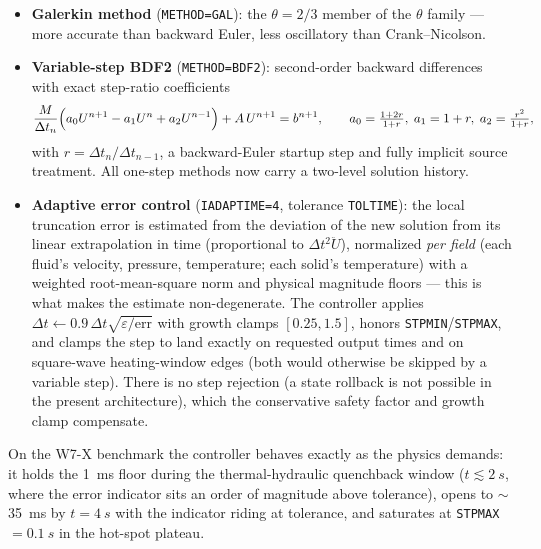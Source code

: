 \documentclass[11pt,a4paper]{article}
\newcommand{\code}[1]{\texttt{#1}}
\begin{document}
\begin{itemize}
  \item \textbf{Galerkin method} (\code{METHOD=GAL}): the $\theta=2/3$ member of the
        $\theta$ family --- more accurate than backward Euler, less oscillatory than
        Crank--Nicolson.
  \item \textbf{Variable-step BDF2} (\code{METHOD=BDF2}): second-order backward
        differences with exact step-ratio coefficients
        \begin{equation*}
          \frac{M}{\Delta t_n}\Bigl(a_0 U^{n+1} - a_1 U^{n} + a_2 U^{n-1}\Bigr)
            + A\,U^{n+1} = b^{n+1},\qquad
          a_0 = \tfrac{1+2r}{1+r},\;
          a_1 = 1+r,\;
          a_2 = \tfrac{r^2}{1+r},
        \end{equation*}
        with $r = \Delta t_n / \Delta t_{n-1}$, a backward-Euler startup step and
        fully implicit source treatment. All one-step methods now carry a two-level
        solution history.
  \item \textbf{Adaptive error control} (\code{IADAPTIME=4}, tolerance
        \code{TOLTIME}): the local truncation error is estimated from the deviation of
        the new solution from its linear extrapolation in time (proportional to
        $\Delta t^2 \ddot U$), normalized \emph{per field} (each fluid's velocity,
        pressure, temperature; each solid's temperature) with a weighted
        root-mean-square norm and physical magnitude floors --- this is what makes the
        estimate non-degenerate. The controller applies
        $\Delta t \leftarrow 0.9\,\Delta t \sqrt{\varepsilon/\mathrm{err}}$ with growth
        clamps $[0.25, 1.5]$, honors \code{STPMIN}/\code{STPMAX}, and clamps the step to
        land exactly on requested output times and on square-wave heating-window edges
        (both would otherwise be skipped by a variable step). There is no step
        rejection (a state rollback is not possible in the present architecture), which
        the conservative safety factor and growth clamp compensate.
\end{itemize}

On the W7-X benchmark the controller behaves exactly as the physics demands: it holds
the \SI{1}{ms} floor during the thermal-hydraulic quenchback window ($t \lesssim
\SI{2}{s}$, where the error indicator sits an order of magnitude above tolerance),
opens to $\sim$\SI{35}{ms} by $t=\SI{4}{s}$ with the indicator riding at tolerance, and
saturates at \code{STPMAX} $=\SI{0.1}{s}$ in the hot-spot plateau.
\end{document}
